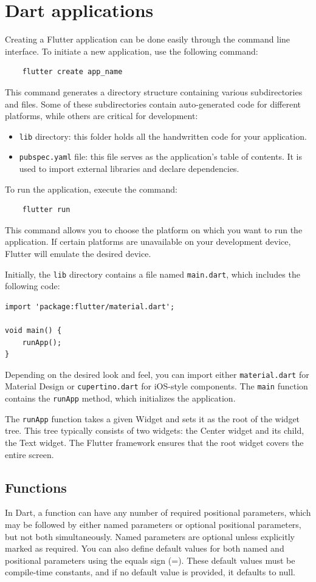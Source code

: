 \section{Dart applications}

Creating a Flutter application can be done easily through the command line interface. 
To initiate a new application, use the following command:
\begin{verbatim}
    flutter create app_name
\end{verbatim}
This command generates a directory structure containing various subdirectories and files. 
Some of these subdirectories contain auto-generated code for different platforms, while others are critical for development:
\begin{itemize}
    \item \texttt{lib} directory: this folder holds all the handwritten code for your application.
    \item \texttt{pubspec.yaml} file: this file serves as the application's table of contents. 
        It is used to import external libraries and declare dependencies.
\end{itemize}
To run the application, execute the command:
\begin{verbatim}
    flutter run
\end{verbatim}
This command allows you to choose the platform on which you want to run the application. 
If certain platforms are unavailable on your development device, Flutter will emulate the desired device. 

Initially, the \texttt{lib} directory contains a file named \texttt{main.dart}, which includes the following code:
\begin{verbatim}
import 'package:flutter/material.dart';
    
void main() {
    runApp();
}
\end{verbatim}
Depending on the desired look and feel, you can import either \texttt{material.dart} for Material Design or \texttt{cupertino.dart} for iOS-style components. 
The \texttt{main} function contains the \texttt{runApp} method, which initializes the application.

The \texttt{runApp} function takes a given Widget and sets it as the root of the widget tree. 
This tree typically consists of two widgets: the Center widget and its child, the Text widget.
The Flutter framework ensures that the root widget covers the entire screen.

\subsection{Functions}
In Dart, a function can have any number of required positional parameters, which may be followed by either named parameters or optional positional parameters, but not both simultaneously. 
Named parameters are optional unless explicitly marked as required. 
You can also define default values for both named and positional parameters using the equals sign (=). 
These default values must be compile-time constants, and if no default value is provided, it defaults to null.

